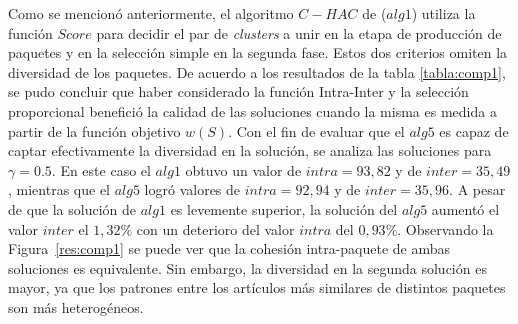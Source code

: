 Como se mencionó anteriormente, el algoritmo $C-HAC$ de \cite{compositeRetrival} ($alg1$) utiliza la función $Score$ para decidir el par de {\em clusters} a unir en la etapa de producción de paquetes y en la selección simple en la segunda fase. Estos dos criterios omiten la diversidad de los paquetes. De acuerdo a los resultados de la tabla \ref{tabla:comp1}, se pudo concluir que haber considerado la función Intra-Inter y la selección proporcional benefició la calidad de las soluciones cuando la misma es medida a partir de la función objetivo $w(S)$. Con el fin de evaluar que el $alg5$ es capaz de captar efectivamente la diversidad en la solución, se analiza las soluciones para $\gamma=0.5$. En este caso el $alg1$ obtuvo un valor de $intra=93,82$ y de $inter=35,49$, mientras que el $alg5$ logró valores de $intra=92,94$ y de $inter=35,96$. A pesar de que la solución de $alg1$ es levemente superior, la solución del $alg5$ aumentó el valor $inter$ el $1,32\%$ con un deterioro del valor $intra$ del $0,93\%$. Observando la Figura~\ref{res:comp1} se puede ver que la cohesión intra-paquete de ambas soluciones es equivalente. Sin embargo, la diversidad en la segunda solución es mayor, ya que los patrones entre los artículos más similares de distintos paquetes son más heterogéneos. 

